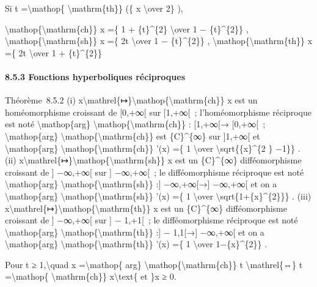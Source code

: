 \documentclass[]{article}
\begin{document}
Si t =\textbackslash{}mathop\{ \textbackslash{}mathrm\{th\}\} (\{ x
\textbackslash{}over 2\} ),

\textbackslash{}mathop\{\textbackslash{}mathrm\{ch\}\} x =\{ 1 +
\{t\}\^{}\{2\} \textbackslash{}over 1 − \{t\}\^{}\{2\}\} ,
\textbackslash{}mathop\{\textbackslash{}mathrm\{sh\}\} x =\{ 2t
\textbackslash{}over 1 − \{t\}\^{}\{2\}\} ,
\textbackslash{}mathop\{\textbackslash{}mathrm\{th\}\} x =\{ 2t
\textbackslash{}over 1 + \{t\}\^{}\{2\}\}

\paragraph{8.5.3 Fonctions hyperboliques réciproques}

Théorème~8.5.2 (i)
x\textbackslash{}mathrel\{↦\}\textbackslash{}mathop\{\textbackslash{}mathrm\{ch\}\}
x est un homéomorphisme croissant de {[}0,+∞{[} sur {[}1,+∞{[}~;
l'homéomorphisme réciproque est noté \textbackslash{}mathop\{arg\}
\textbackslash{}mathop\{\textbackslash{}mathrm\{ch\}\} : {[}1,+∞{[}→
{[}0,+∞{[}~; \textbackslash{}mathop\{arg\}
\textbackslash{}mathop\{\textbackslash{}mathrm\{ch\}\} est
\{C\}\^{}\{∞\} sur {]}1,+∞{[} et \textbackslash{}mathop\{arg\}
\textbackslash{}mathop\{\textbackslash{}mathrm\{ch\}\} '(x) =\{ 1
\textbackslash{}over \textbackslash{}sqrt\{\{x\}\^{}\{2 \} −1\}\} . (ii)
x\textbackslash{}mathrel\{↦\}\textbackslash{}mathop\{\textbackslash{}mathrm\{sh\}\}
x est un \{C\}\^{}\{∞\} difféomorphisme croissant de {]} −∞,+∞{[} sur
{]} −∞,+∞{[}~; le difféomorphisme réciproque est noté
\textbackslash{}mathop\{arg\}
\textbackslash{}mathop\{\textbackslash{}mathrm\{sh\}\} :{]} −∞,+∞{[}→{]}
−∞,+∞{[} et on a \textbackslash{}mathop\{arg\}
\textbackslash{}mathop\{\textbackslash{}mathrm\{sh\}\} '(x) =\{ 1
\textbackslash{}over \textbackslash{}sqrt\{1+\{x\}\^{}\{2\}\}\} . (iii)
x\textbackslash{}mathrel\{↦\}\textbackslash{}mathop\{\textbackslash{}mathrm\{th\}\}
x est un \{C\}\^{}\{∞\} difféomorphisme croissant de {]} −∞,+∞{[} sur
{]} − 1,+1{[}~; le difféomorphisme réciproque est noté
\textbackslash{}mathop\{arg\}
\textbackslash{}mathop\{\textbackslash{}mathrm\{th\}\} :{]} − 1,1{[}→{]}
−∞,+∞{[} et on a \textbackslash{}mathop\{arg\}
\textbackslash{}mathop\{\textbackslash{}mathrm\{th\}\} '(x) =\{ 1
\textbackslash{}over 1−\{x\}\^{}\{2\}\} .

Pour t ≥ 1,\textbackslash{}quad x =\textbackslash{}mathop\{ arg\}
\textbackslash{}mathop\{\textbackslash{}mathrm\{ch\}\} t
\textbackslash{}mathrel\{⇔\} t =\textbackslash{}mathop\{
\textbackslash{}mathrm\{ch\}\} x\textbackslash{}text\{ et \}x ≥ 0.
\end{document}
